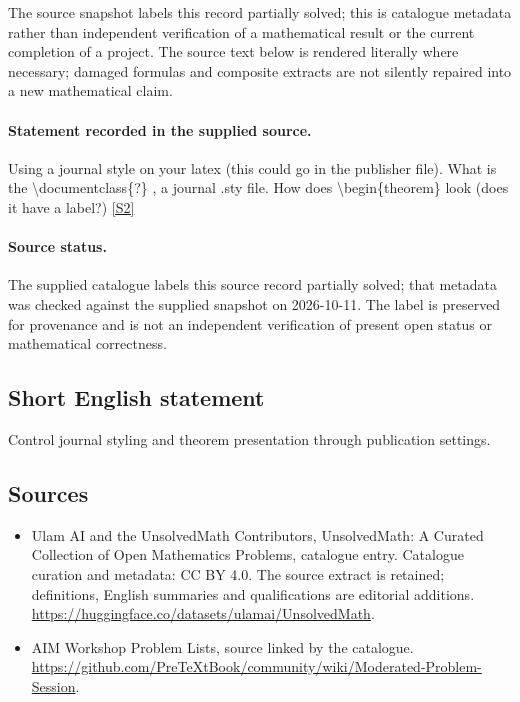 \documentclass[11pt]{article}
\begin{document}
The source snapshot labels this record partially solved; this is catalogue metadata rather than independent verification of a mathematical result or the current completion of a project.
The source text below is rendered literally where necessary; damaged formulas and composite extracts are not silently repaired into a new mathematical claim.
\paragraph{Statement recorded in the supplied source.}
Using a journal style on your latex (this could go in the publisher file). What is the \textbackslash{}documentclass\{?\} , a journal .sty file. How does \textbackslash{}begin\{theorem\} look (does it have a label?) \href{https://github.com/PreTeXtBook/community/wiki/Moderated-Problem-Session}{[S2]}
\paragraph{Source status.}
The supplied catalogue labels this source record partially solved; that metadata was checked against the supplied snapshot on 2026-10-11. The label is preserved for provenance and is not an independent verification of present open status or mathematical correctness.
\subsection{Short English statement}
Control journal styling and theorem presentation through publication settings.
\subsection{Sources}
\begin{itemize}
\item[S1] Ulam AI and the UnsolvedMath Contributors, UnsolvedMath: A Curated Collection of Open Mathematics Problems, catalogue entry. Catalogue curation and metadata: CC BY 4.0. The source extract is retained; definitions, English summaries and qualifications are editorial additions.
\url{https://huggingface.co/datasets/ulamai/UnsolvedMath}.
\item[S2] AIM Workshop Problem Lists, source linked by the catalogue.
\url{https://github.com/PreTeXtBook/community/wiki/Moderated-Problem-Session}.
\end{itemize}
\end{document}
